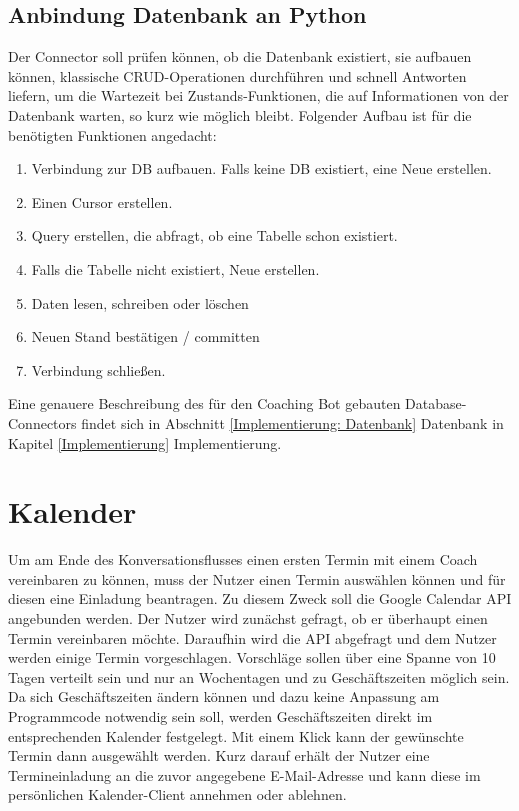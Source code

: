         \subsection{Anbindung Datenbank an Python} \label{Realisierung: data base connector}
            Der Connector soll prüfen können, ob die Datenbank existiert, sie aufbauen können, klassische CRUD-Operationen durchführen und schnell Antworten liefern, um die Wartezeit bei Zustands-Funktionen, die auf Informationen von der Datenbank warten, so kurz wie möglich bleibt. Folgender Aufbau ist für die benötigten Funktionen angedacht:
            \begin{enumerate}
                \item Verbindung zur DB aufbauen. Falls keine DB existiert, eine Neue erstellen.
                \item Einen Cursor erstellen.
                \item Query erstellen, die abfragt, ob eine Tabelle schon existiert.
                \item Falls die Tabelle nicht existiert, Neue erstellen.
                \item Daten lesen, schreiben oder löschen
                \item Neuen Stand bestätigen / committen
                \item Verbindung schließen.
            \end{enumerate}

            Eine genauere Beschreibung des für den Coaching Bot gebauten Database-Connectors findet sich in Abschnitt \ref*{Implementierung: Datenbank} Datenbank in Kapitel \ref*{Implementierung} Implementierung.


    \section{Kalender} \label{Realisierung: calendar}
        Um am Ende des Konversationsflusses einen ersten Termin mit einem Coach vereinbaren zu können, muss der Nutzer einen Termin auswählen können und für diesen eine Einladung beantragen. Zu diesem Zweck soll die Google Calendar API angebunden werden. Der Nutzer wird zunächst gefragt, ob er überhaupt einen Termin vereinbaren möchte. Daraufhin wird die API abgefragt und dem Nutzer werden einige Termin vorgeschlagen. Vorschläge sollen über eine Spanne von 10 Tagen verteilt sein und nur an Wochentagen und zu Geschäftszeiten möglich sein. Da sich Geschäftszeiten ändern können und dazu keine Anpassung am Programmcode notwendig sein soll, werden Geschäftszeiten direkt im entsprechenden Kalender festgelegt. Mit einem Klick kann der gewünschte Termin dann ausgewählt werden. Kurz darauf erhält der Nutzer eine Termineinladung an die zuvor angegebene E-Mail-Adresse und kann diese im persönlichen Kalender-Client annehmen oder ablehnen. \\
        

